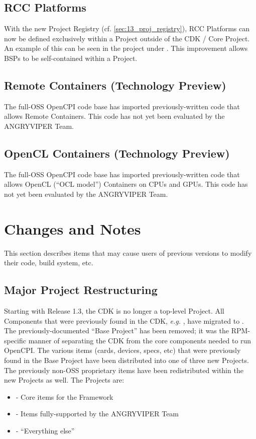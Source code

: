 \subsection{RCC Platforms}
\label{sec:13_rcc_platforms}
With the new Project Registry (cf. \ref{sec:13_proj_registry}), RCC Platforms can now be defined exclusively within a Project outside of the CDK / Core Project. An example of this can be seen in the  project under . This improvement allows BSPs to be self-contained within a Project.

\subsection{Remote Containers (Technology Preview)}
The full-OSS OpenCPI code base has imported previously-written code that allows Remote Containers. This code has not yet been evaluated by the ANGRYVIPER Team.

\subsection{OpenCL Containers (Technology Preview)}
The full-OSS OpenCPI code base has imported previously-written code that allows OpenCL (``OCL model'') Containers on CPUs and GPUs. This code has not yet been evaluated by the ANGRYVIPER Team.

\section{Changes and Notes}
This section describes items that may cause users of previous versions to modify their code, build system, etc.

\subsection{Major Project Restructuring} %
\label{sec:13_restructure}
Starting with Release 1.3, the CDK is no longer a top-level Project. All Components that were previously found in the CDK, \textit{e.g.} , have migrated to . The previously-documented ``Base Project'' has been removed; it was the RPM-specific manner of separating the CDK from the core components needed to run OpenCPI. The various items (cards, devices, specs, etc) that were previously found in the Base Project have been distributed into one of three new Projects. The previously non-OSS proprietary items have been redistributed within the new Projects as well. The Projects are:
\begin{itemize}
\setlength\itemsep{0em} %
\item {} - Core items for the Framework
\item {} - Items fully-supported by the ANGRYVIPER Team
\item {} - ``Everything else''
\end{itemize}

